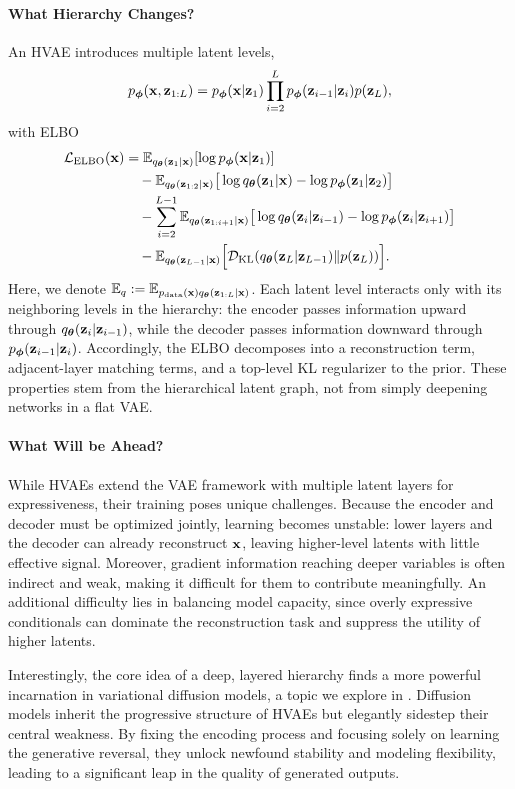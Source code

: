 \paragraph{What Hierarchy Changes?}
An HVAE introduces multiple latent levels,
\[
p_{\bm{\phi}}({\mathbf{x}},{\mathbf{z}}_{1:L})=p_{\bm{\phi}}({\mathbf{x}}|{\mathbf{z}}_1)\prod_{i=2}^L p_{\bm{\phi}}({\mathbf{z}}_{i-1}|{\mathbf{z}}_i) p({\mathbf{z}}_L),
\]
with ELBO
\begin{align*}
\mathcal L_{\mathrm{ELBO}}({\mathbf{x}})
&= \mathbb{E}_{q_{\bm{\theta}}({\mathbf{z}}_1|{\mathbf{x}})}[\log p_{\bm{\phi}}({\mathbf{x}}|{\mathbf{z}}_1)]
\\
&\quad - \mathbb{E}_{q_{\bm{\theta}}({\mathbf{z}}_{1:2}|{\mathbf{x}})}
\big[\log q_{\bm{\theta}}({\mathbf{z}}_1|{\mathbf{x}})-\log p_{\bm{\phi}}({\mathbf{z}}_1|{\mathbf{z}}_2)\big]
\\
&\quad - \sum_{i=2}^{L-1}
\mathbb{E}_{q_{\bm{\theta}}({\mathbf{z}}_{1:i+1}|{\mathbf{x}})}
\big[\log q_{\bm{\theta}}({\mathbf{z}}_i|{\mathbf{z}}_{i-1})-\log p_{\bm{\phi}}({\mathbf{z}}_i|{\mathbf{z}}_{i+1})\big]
\\
&\quad - \mathbb{E}_{q_{\bm{\theta}}({\mathbf{z}}_{L-1}|{\mathbf{x}})}
\Big[\mathcal{D}_{\mathrm{KL}}(q_{\bm{\theta}}({\mathbf{z}}_L|{\mathbf{z}}_{L-1}) \| p({\mathbf{z}}_L))\Big].
\end{align*}
Here, we denote $\mathbb{E}_q := \mathbb{E}_{p_{\mathrm{data}}({\mathbf{x}}) q_{{\bm{\theta}}}({\mathbf{z}}_{1:L}|{\mathbf{x}})}$.
Each latent level interacts only with its neighboring levels in the
hierarchy: the encoder passes information upward through
$q_{\bm{\theta}}({\mathbf{z}}_i|{\mathbf{z}}_{i-1})$, while the decoder passes information
downward through $p_{\bm{\phi}}({\mathbf{z}}_{i-1}|{\mathbf{z}}_i)$. Accordingly, the ELBO
decomposes into a reconstruction term, adjacent-layer matching terms,
and a top-level KL regularizer to the prior. These properties stem from
the hierarchical latent graph, not from simply deepening networks in a
flat VAE.

\paragraph{What Will be Ahead?}
While HVAEs extend the VAE framework with multiple latent layers for expressiveness, their training poses unique challenges. Because the encoder and decoder must be optimized jointly, learning becomes unstable: lower layers and the decoder can already reconstruct ${\mathbf{x}}$, leaving higher-level latents with little effective signal. Moreover, gradient information reaching deeper variables is often indirect and weak, making it difficult for them to contribute meaningfully. An additional difficulty lies in balancing model capacity, since overly expressive conditionals  can dominate the reconstruction task and suppress the utility of higher latents. 


Interestingly, the core idea of a deep, layered hierarchy finds a more powerful incarnation in variational diffusion models, a topic we explore in . Diffusion models inherit the progressive structure of HVAEs but elegantly sidestep their central weakness. By fixing the encoding process and focusing solely on learning the generative reversal, they unlock newfound stability and modeling flexibility, leading to a significant leap in the quality of generated outputs.

